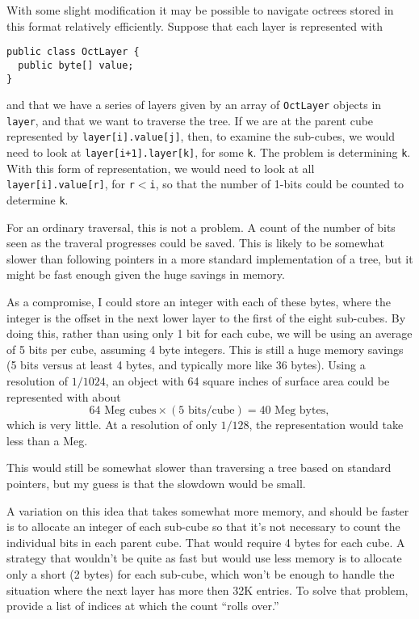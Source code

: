 \documentclass[titlepage,oneside,10pt]{article}
\begin{document}
With some slight modification it may be possible to navigate octrees
stored in this format relatively efficiently. Suppose that each layer
is represented with
\begin{verbatim}
public class OctLayer {
  public byte[] value;
}
\end{verbatim}
and that we have a series of layers given by an array of
{\tt OctLayer} objects in \verb=layer=, and that we want to traverse
the tree. If we are at the parent cube represented by
\verb=layer[i].value[j]=, then, to examine the sub-cubes, we would
need to look at \verb=layer[i+1].layer[k]=, for some \verb=k=. The
problem is determining {\tt k}. With this form of representation, we
would need to look at all {\tt layer[i].value[r]}, for {\tt r}$<${\tt i},
so that the number of 1-bits could be counted to determine {\tt k}.

For an ordinary traversal, this is not a problem. A count of the
number of bits seen as the traveral progresses could be saved. This is
likely to be somewhat slower than following pointers in a more
standard implementation of a tree, but it might be fast enough given
the huge savings in memory.

As a compromise, I could store an integer with each of these bytes,
where the integer is the offset in the next lower layer to the first
of the eight sub-cubes. By doing this, rather than using only 1 bit
for each cube, we will be using an average of 5 bits per cube,
assuming 4 byte integers. This is still a huge memory savings (5 bits
versus at least 4 bytes, and typically more like 36 bytes). Using a
resolution of $1/1024$, an object with 64 square inches of surface
area could be represented with about
$$64\mbox{ Meg cubes} \times (5\mbox{ bits}/\mbox{cube}) = 40
\mbox{ Meg bytes},$$
which is very little. At a resolution of only $1/128$, the
representation would take less than a Meg.

This would still be somewhat slower than traversing a tree based on
standard pointers, but my guess is that the slowdown would be small.

A variation on this idea that takes somewhat more memory, and should be
faster is to allocate an integer of each sub-cube so that it's not
necessary to count the individual bits in each parent cube. That would
require 4 bytes for each cube. A strategy that wouldn't be quite as
fast but would use less memory is to allocate only a short (2 bytes) for
each sub-cube, which won't be enough to handle the situation where the
next layer has more then 32K entries. To solve that problem, provide a
list of indices at which the count ``rolls over.''
\end{document}
